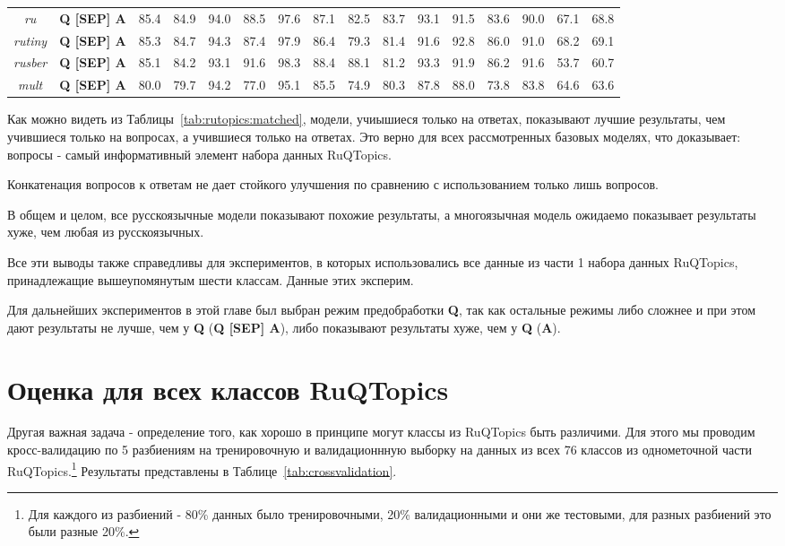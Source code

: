 \begin{table*}
{\begin{tabular}{|c|c||c|c|c|c|c|c|c|c|c|c|c|c|c|c|}
\textit{ru} &  \textbf{Q [SEP] A} & 85.4 & 84.9 & 94.0 & 88.5 & 97.6 & 87.1 & 82.5 & 83.7 & 93.1 & 91.5 & 83.6 & 90.0 & 67.1 & 68.8\\ %
\textit{rutiny} &  \textbf{Q [SEP] A} & 85.3 & 84.7 & 94.3 & 87.4 & 97.9 & 86.4 & 79.3 & 81.4 & 91.6 & 92.8 & 86.0 & 91.0 & 68.2 & 69.1\\ %
\textit{rusber} &  \textbf{Q [SEP] A} & 85.1 & 84.2 & 93.1 & 91.6 & 98.3 & 88.4 & 88.1 & 81.2 & 93.3 & 91.9 & 86.2 & 91.6 & 53.7 & 60.7\\ %
\textit{mult} &  \textbf{Q [SEP] A} & 80.0 & 79.7 & 94.2 & 77.0 & 95.1 & 85.5 & 74.9 & 80.3 & 87.8 & 88.0 & 73.8 & 83.8 & 64.6 & 63.6\\ \hline
\end{tabular}
}
\end{table*}

Как можно видеть из Таблицы~\ref{tab:rutopics:matched}, модели, учиышиеся только на ответах, показывают лучшие результаты, чем учившиеся только на вопросах, а учившиеся только на ответах. Это верно для всех рассмотренных базовых моделях, что доказывает: вопросы - самый информативный элемент набора данных {RuQTopics}. 

Конкатенация вопросов к ответам не дает стойкого улучшения по сравнению с использованием только лишь вопросов. 

В общем и целом, все русскоязычные модели показывают похожие результаты, а многоязычная модель ожидаемо показывает результаты хуже, чем любая из русскоязычных. 

Все эти выводы также справедливы для экспериментов, в которых использовались все данные из части 1 набора данных {RuQTopics}, принадлежащие вышеупомянутым шести классам. Данные этих эксперим.

Для дальнейших экспериментов в этой главе был выбран режим предобработки \textbf{Q}, так как остальные режимы либо сложнее и при этом дают результаты не лучше, чем у \textbf{Q} (\textbf{Q [SEP] A}), либо показывают результаты хуже, чем у \textbf{Q} (\textbf{A}).

\section{Оценка для всех классов {RuQTopics}}

Другая важная задача - определение того, как хорошо в принципе могут классы из {RuQTopics} быть различими. Для этого мы проводим кросс-валидацию по 5 разбиениям на тренировочную и валидационнную выборку на данных из всех 76 классов из однометочной части {RuQTopics}.\footnote{Для каждого из разбиений - 80\% данных было тренировочными, 20\% валидационными и они же тестовыми, для разных разбиений это были разные 20\%.} Результаты представлены в Таблице~\ref{tab:crossvalidation}.


